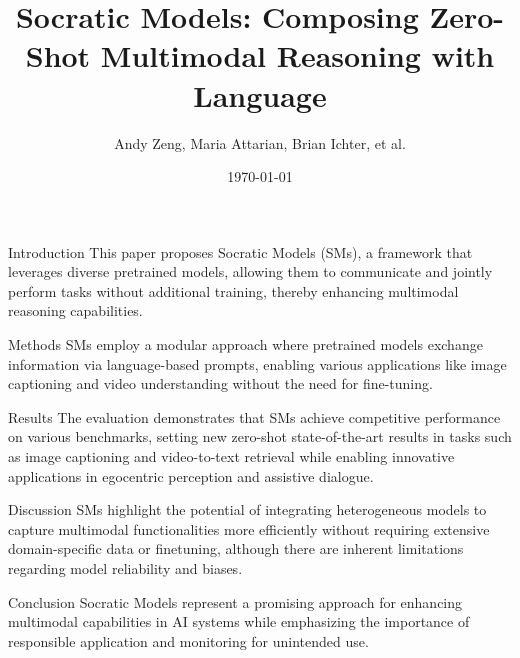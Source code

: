 \documentclass{beamer}
\title{Socratic Models: Composing Zero-Shot Multimodal Reasoning with Language}
\author{Andy Zeng, Maria Attarian, Brian Ichter, et al.}
\date{\today}
\begin{document}
\frame{\titlepage}

\begin{frame}{Introduction}
    This paper proposes Socratic Models (SMs), a framework that leverages diverse pretrained models, allowing them to communicate and jointly perform tasks without additional training, thereby enhancing multimodal reasoning capabilities.
\end{frame}

\begin{frame}{Methods}
    SMs employ a modular approach where pretrained models exchange information via language-based prompts, enabling various applications like image captioning and video understanding without the need for fine-tuning.
\end{frame}

\begin{frame}{Results}
    The evaluation demonstrates that SMs achieve competitive performance on various benchmarks, setting new zero-shot state-of-the-art results in tasks such as image captioning and video-to-text retrieval while enabling innovative applications in egocentric perception and assistive dialogue.
\end{frame}

\begin{frame}{Discussion}
    SMs highlight the potential of integrating heterogeneous models to capture multimodal functionalities more efficiently without requiring extensive domain-specific data or finetuning, although there are inherent limitations regarding model reliability and biases.
\end{frame}

\begin{frame}{Conclusion}
    Socratic Models represent a promising approach for enhancing multimodal capabilities in AI systems while emphasizing the importance of responsible application and monitoring for unintended use.
\end{frame}
\end{document}
